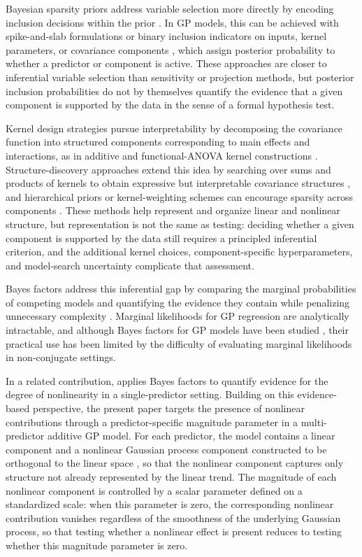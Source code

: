 \documentclass{article}
\begin{document}
Bayesian sparsity priors address variable selection more directly by encoding inclusion decisions within the prior \parencite{mitchell1988bayesian, george1993variable}. In GP models, this can be achieved with spike-and-slab formulations or binary inclusion indicators on inputs, kernel parameters, or covariance components \parencite{linkletter2006variable, savitsky2011, titsias2011spike}, which assign posterior probability to whether a predictor or component is active. These approaches are closer to inferential variable selection than sensitivity or projection methods, but posterior inclusion probabilities do not by themselves quantify the evidence that a given component is supported by the data in the sense of a formal hypothesis test.

Kernel design strategies pursue interpretability by decomposing the covariance function into structured components corresponding to main effects and interactions, as in additive and functional-ANOVA kernel constructions \parencite{duvenaud2011a, durrande2013anova}. Structure-discovery approaches extend this idea by searching over sums and products of kernels to obtain expressive but interpretable covariance structures \parencite{duvenaud2013structure}, and hierarchical priors or kernel-weighting schemes can encourage sparsity across components \parencite{archambeau2011multiple}. These methods help represent and organize linear and nonlinear structure, but representation is not the same as testing: deciding whether a given component is supported by the data still requires a principled inferential criterion, and the additional kernel choices, component-specific hyperparameters, and model-search uncertainty complicate that assessment.

Bayes factors address this inferential gap by comparing the marginal probabilities of competing models and quantifying the evidence they contain while penalizing unnecessary complexity \parencite{kass1995bayes, jeffreys1961theory}. Marginal likelihoods for GP regression are analytically intractable, and although Bayes factors for GP models have been studied \parencite{mukhopadhyay2021}, their practical use has been limited by the difficulty of evaluating marginal likelihoods in non-conjugate settings.

In a related contribution, \textcite{mulder2023} applies Bayes factors to quantify evidence for the degree of nonlinearity in a single-predictor setting. Building on this evidence-based perspective, the present paper targets the presence of nonlinear contributions through a predictor-specific magnitude parameter in a multi-predictor additive GP model. For each predictor, the model contains a linear component and a nonlinear Gaussian process component constructed to be orthogonal to the linear space \parencite{PlumleeJoseph2018}, so that the nonlinear component captures only structure not already represented by the linear trend. The magnitude of each nonlinear component is controlled by a scalar parameter defined on a standardized scale: when this parameter is zero, the corresponding nonlinear contribution vanishes regardless of the smoothness of the underlying Gaussian process, so that testing whether a nonlinear effect is present reduces to testing whether this magnitude parameter is zero.
\end{document}
